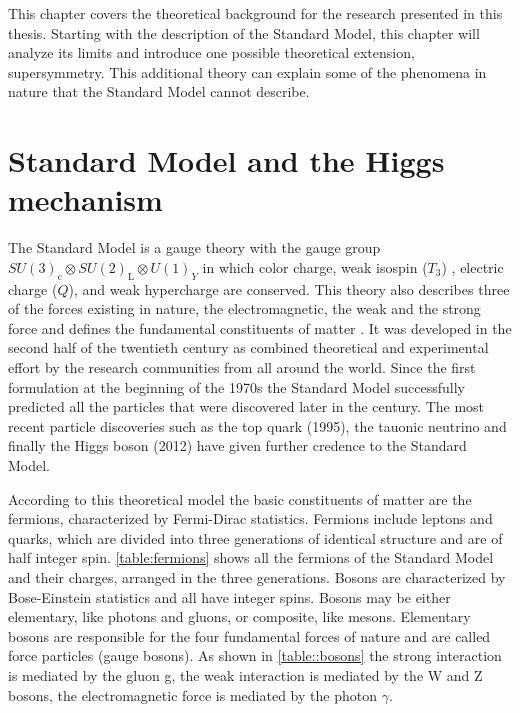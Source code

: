 
This chapter covers the theoretical background for the research presented in this thesis. Starting with the description of the Standard Model, this chapter will analyze its limits and introduce one possible theoretical extension, supersymmetry. This additional theory can explain some of the phenomena in nature that the Standard Model cannot describe.

\section{Standard Model and the Higgs mechanism}

The Standard Model is a gauge theory with the gauge group $SU(3)_\mathrm{c} \otimes SU(2)_\mathrm{L} \otimes U(1)_Y$ in which color charge, weak isospin ($T_3$) , electric charge ($Q$), and weak hypercharge are conserved. This theory also describes three of the forces existing in nature, the electromagnetic, the weak and the strong force and defines the fundamental constituents of matter \cite{Spiesberger:2000ks}. It was developed in the second half of the twentieth century as combined theoretical and experimental effort by the research communities from all around the world. Since the first formulation at the beginning of the 1970s the Standard Model successfully predicted all the particles that were discovered later in the century. The most recent particle discoveries such as the top quark \cite{Campagnari:1996ai} (1995), the tauonic neutrino \cite{Agafonova:2015jxn} and finally the Higgs boson \cite{Aad:2012tfa,Chatrchyan:2012xdj}(2012) have given further credence to the Standard Model. 

According to this theoretical model the basic constituents of matter are the fermions, characterized by Fermi-Dirac statistics. Fermions include leptons and quarks, which are divided into three generations of identical structure and are of half integer spin. \autoref{table:fermions} shows all the fermions of the Standard Model and their charges, arranged in the three generations. Bosons are characterized by Bose-Einstein statistics and all have integer spins. Bosons may be either elementary, like photons and gluons, or composite, like mesons. Elementary bosons are responsible for the four fundamental forces of nature and are called force particles (gauge bosons). As shown in \autoref{table::bosons} the strong interaction is mediated by the gluon g, the weak interaction is mediated by the W and Z bosons, the electromagnetic force is mediated by the photon $\gamma$. 

